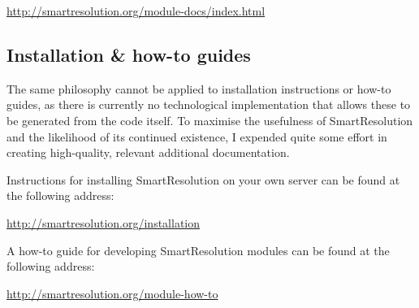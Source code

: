 \url{http://smartresolution.org/module-docs/index.html}

\subsection{Installation \& how-to guides}

The same philosophy cannot be applied to installation instructions or how-to guides, as there is currently no technological implementation that allows these to be generated from the code itself. To maximise the usefulness of SmartResolution and the likelihood of its continued existence, I expended quite some effort in creating high-quality, relevant additional documentation.

Instructions for installing SmartResolution on your own server can be found at the following address:

\url{http://smartresolution.org/installation}

A how-to guide for developing SmartResolution modules can be found at the following address:

\url{http://smartresolution.org/module-how-to}